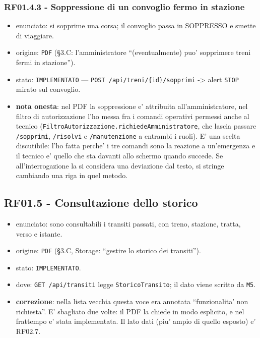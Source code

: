 \documentclass[11pt]{article}
\begin{document}
\subsubsection{RF01.4.3 - Soppressione di un convoglio fermo in stazione}
\label{sec:org9828190}
\begin{itemize}
\item enunciato: si sopprime una corsa; il convoglio passa in SOPPRESSO e smette di viaggiare.
\item origine: \texttt{PDF} (§3.C: l'amministratore ``(eventualmente) puo' sopprimere treni fermi in stazione'').
\item stato: \texttt{IMPLEMENTATO} — \texttt{POST /api/treni/\{id\}/sopprimi} -> alert \texttt{STOP} mirato sul convoglio.
\item \textbf{nota onesta}: nel PDF la soppressione e' attribuita all'amministratore, nel filtro di
autorizzazione l'ho messa fra i comandi operativi permessi anche al tecnico
(\texttt{FiltroAutorizzazione.richiedeAmministratore}, che lascia passare \texttt{/sopprimi}, \texttt{/risolvi} e
\texttt{/manutenzione} a entrambi i ruoli). E' una scelta discutibile: l'ho fatta perche' i tre comandi
sono la reazione a un'emergenza e il tecnico e' quello che sta davanti allo schermo quando
succede. Se all'interrogazione la si considera una deviazione dal testo, si stringe cambiando una
riga in quel metodo.
\end{itemize}
\subsection{RF01.5 - Consultazione dello storico}
\label{sec:org1e6611b}

\begin{itemize}
\item enunciato: sono consultabili i transiti passati, con treno, stazione, tratta, verso e istante.
\item origine: \texttt{PDF} (§3.C, Storage: ``gestire lo storico dei transiti'').
\item stato: \texttt{IMPLEMENTATO}.
\item dove: \texttt{GET /api/transiti} legge \texttt{StoricoTransito}; il dato viene scritto da \texttt{M5}.
\item \textbf{correzione}: nella lista vecchia questa voce era annotata ``funzionalita' non richiesta''. E'
sbagliato due volte: il PDF la chiede in modo esplicito, e nel frattempo e' stata implementata.
Il lato dati (piu' ampio di quello esposto) e' RF02.7.
\end{itemize}
\end{document}
